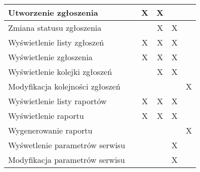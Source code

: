 \begin{table}[]
\begin{tabular}{|l|c|c|c|c|c|}
        \hline
        Utworzenie zgłoszenia              &               & X                & X                  &                        &                 \\
        \hline
        Zmiana statusu zgłoszenia          &               &                  & X                  & X                      &                 \\
        \hline
        Wyświetlenie listy zgłoszeń        &               & X                & X                  & X                      &                 \\
        \hline
        Wyświetlenie zgłoszenia            &               & X                & X                  & X                      &                 \\
        \hline
        Wyświetlenie kolejki zgłoszeń      &               &                  & X                  & X                      &                 \\
        \hline
        Modyfikacja kolejności zgłoszeń    &               &                  &                    &                        & X               \\
        \hline
        Wyświetlenie listy raportów        &               & X                & X                  & X                      &                 \\
        \hline
        Wyświetlenie raportu               &               & X                & X                  & X                      &                 \\
        \hline
        Wygenerowanie raportu              &               &                  &                    &                        & X               \\
        \hline
        Wyśwetlenie parametrów serwisu     &               &                  &                    & X                      &                 \\
        \hline
        Modyfikacja parametrów serwisu     &               &                  &                    & X                      &                 \\
        \hline
    \end{tabular}
\end{table}